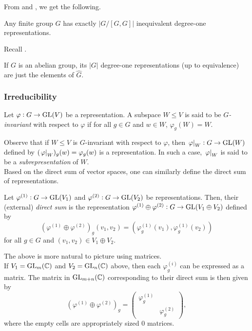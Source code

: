 			From  and , we get the following.

			\begin{corollary}
				Any finite group $G$ has exactly $|G/[G,G]|$ inequivalent degree-one representations.
			\end{corollary}

			Recall .

			\begin{fcor}
				\label{cor: deg one reps of abelian group}
				If $G$ is an abelian group, its $|G|$ degree-one representations (up to equivalence) are just the elements of $\hat{G}$.
			\end{fcor}

		\subsubsection{Irreducibility}

			\begin{fdef}
				Let $\varphi : G \to \operatorname{GL}(V)$ be a representation. A subspace $W \le V$ is said to be \emph{$G$-invariant} with respect to $\varphi$ if for all $g \in G$ and $w \in W$, $\varphi_g(W) = W$.
			\end{fdef}

			Observe that if $W\le V$ is $G$-invariant with respect to $\varphi$, then $\left.\varphi\right|_{W} : G \to \operatorname{GL}(W)$ defined by $(\left.\varphi\right|_{W})_g(w) = \varphi_g(w)$ is a representation. In such a case, $\left.\varphi\right|_{W}$ is said to be a \emph{subrepresentation} of $W$.\\
			Based on the direct sum of vector spaces, one can similarly define the direct sum of representations.

			\begin{fdef}
				Let $\varphi^{(1)} : G \to \operatorname{GL}(V_1)$ and $\varphi^{(2)} : G \to \operatorname{GL}(V_2)$ be representations. Then, their (external) \emph{direct sum} is the representation $\varphi^{(1)} \oplus \varphi^{(2)} : G \to \operatorname{GL}(V_1 \oplus V_2)$ defined by
				\[ \left(\varphi^{(1)} \oplus \varphi^{(2)}\right)_g(v_1,v_2) = (\varphi^{(1)}_g(v_1), \varphi^{(1)}_g(v_2)) \]
				for all $g \in G$ and $(v_1,v_2) \in V_1 \oplus V_2$.
			\end{fdef}

			The above is more natural to picture using matrices.\\
			If $V_1 = \operatorname{GL}_m(\mathbb{C})$ and $V_2 = \operatorname{GL}_n(\mathbb{C})$ above, then each $\varphi^{(i)}_g$ can be expressed as a matrix. The matrix in $\operatorname{GL}_{m+n}(\mathbb{C})$ corresponding to their direct sum is then given by
			\[ \left( \varphi^{(1)} \oplus \varphi^{(2)} \right)_g = \begin{pmatrix} \varphi^{(1)}_g &  \\  & \varphi^{(2)}_g \end{pmatrix}, \]
			where the empty cells are appropriately sized $0$ matrices.\\
			
